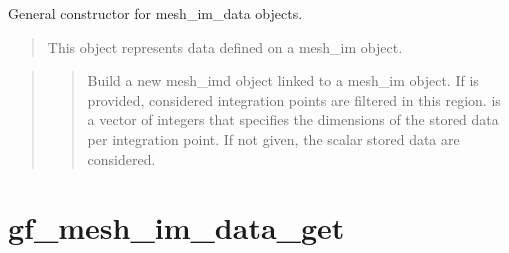 \documentclass[a4paper,11pt,english]{sphinxmanual}
\begin{document}
\sphinxAtStartPar
{}

\sphinxAtStartPar
General constructor for mesh\_im\_data objects.
\begin{quote}

\sphinxAtStartPar
This object represents data defined on a mesh\_im object.
\end{quote}

\sphinxAtStartPar
{}
\begin{quote}

\sphinxAtStartPar
{}
\begin{quote}

\sphinxAtStartPar
Build a new mesh\_imd object linked to a mesh\_im object. If  is
provided, considered integration points are filtered in this region.
 is a vector of integers that specifies the dimensions of the
stored data per integration point. If not given, the scalar stored
data are considered.
\end{quote}
\end{quote}


\section{gf\_mesh\_im\_data\_get}
\label{\detokenize{matlab_octave/cmdref_gf_mesh_im_data_get:gf-mesh-im-data-get}}\label{\detokenize{matlab_octave/cmdref_gf_mesh_im_data_get::doc}}
\sphinxAtStartPar
{}

\begin{sphinxVerbatim}[commandchars=\\\{\}]
  
  
  
  
  
    
\end{sphinxVerbatim}
\end{document}
